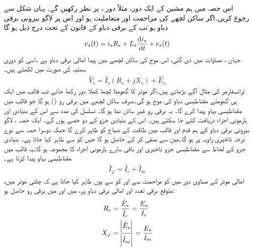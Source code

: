اس حصہ میں ہم مشین کے ایک دور، مثلاً دور ،  پر نظر رکھیں گے۔ یہاں شکل   سے رجوع کریں۔اگر ساکن لچھے کی مزاحمت  اور متعاملیت  ہو اور اس پر لاگو بیرونی برقی دباو  ہو تب  کے برقی دباو کے قانون کے تحت درج ذیل ہو گا
\begin{align}
v_s(t)=i_s R_s +L_s \frac{\dif i_s}{\dif t}+e_s(t)
\end{align}
جہاں ،  مساوات   میں دی گئی، اس موج کی ساکن لچھے میں پیدا امالی برقی دباو ہے ۔اسی کو دوری سمتیہ کی صورت میں لکھتے ہیں۔
\begin{align}\label{مساوات_امالی_دوری_موٹر_مساوات}
\hat{V}_s=\hat{I}_s \left(R_s+j X_s \right)+\hat{E}_s
\end{align}
ٹرانسفارمر کی مثال آگے بڑھاتے ہیں۔اگر موٹر کا گھومتا لچھا کھلا دور رکھا جائے تب قالب میں ایک ہی گھومتے مقناطیسی دباو کی موج  ہو گی۔صرف ساکن لچھے میں برقی رو () ہو گا جو قالب میں مقناطیسی بہاو  پیدا کرے گا۔ یہ برقی رو  غیر سائن نما ہو گا۔  تسلسل کی مدد سے اس کے بنیادی  اور ہارمونی اجزاء دریافت کئے جا سکتے ہیں۔ اس کے بنیادی جزو کے دو حصے ہوں گے۔ ایک حصہ  ، لاگو بیرونی برقی دباو  کے ہم قدم اور قالب میں طاقت کے ضیاع کو ظاہر کرے گا جبکہ  دوسرا حصہ  سے نوے درجہ تاخیری زاویہ پر ہو گا۔میں سے  منفی کر کے  حاصل ہو گا جس کو   سے ظاہر کیا جاتا ہے۔ بنیادی جزو کے لحاظ سے مقناطیسی جزو  تاخیری   اور باقی سارے ہارمونی اجزاء کا مجموعہ ہو گا۔یہ قالب میں مقناطیسی بہاو  پیدا کرتا ہے۔
\begin{align}
\hat{I}_\varphi=\hat{I}_c+\hat{I}_m
\end{align}
 امالی موٹر کے مساوی دور میں  کو مزاحمت  سے اور  کو  سے یوں ظاہر کیا جاتا ہے کہ چلتی موٹر میں، متوقع برقی تعدد  اور امالی برقی دباو  پر،   میں  اور  میں  برقی رو حاصل ہو:
\begin{gather}
\begin{aligned}
R_c&=\frac{\hat{E}_s}{\hat{I}_c}=\frac{E_s}{I_c}\\
X_\varphi&=\frac{\abs{\hat{E}_s}}{\abs{\hat{I}_m}}=\frac{E_s}{I_m}
\end{aligned}
\end{gather}
